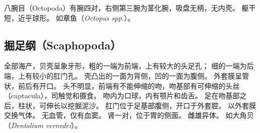 \documentclass[11pt]{article}
\begin{document}
\newline

八腕目（Octopoda）有腕四对，右侧第三腕为茎化腕，吸盘无柄，无内壳。
躯干短，近乎球形。
如章鱼（\textit{Octopus spp.}）。

\subsection{掘足纲（Scaphopoda）}
全部海产，贝壳呈象牙形，粗的一端为前端，上有较大的头足孔；
细的一端为后端，上有较小的肛门孔。
壳凸出的一面为背侧，凹的一面为腹侧。
外套膜呈管状，前后有开口。
头不明显，前端有不能伸缩的吻，吻基部有可伸缩的头丝（captacula），司触觉和摄食。
吻内为口球，内有颚片和齿舌。
足在吻基部之后，柱状，可伸长以挖掘泥沙。
肛门位于足基部腹侧，开口于外套腔。
以外套膜交换气体。
无血管，仅有血窦。
肾一对，位于胃的侧面。
雌雄异体。
如大角贝（\textit{Dentalium vernedei}）。
  
\end{document}
